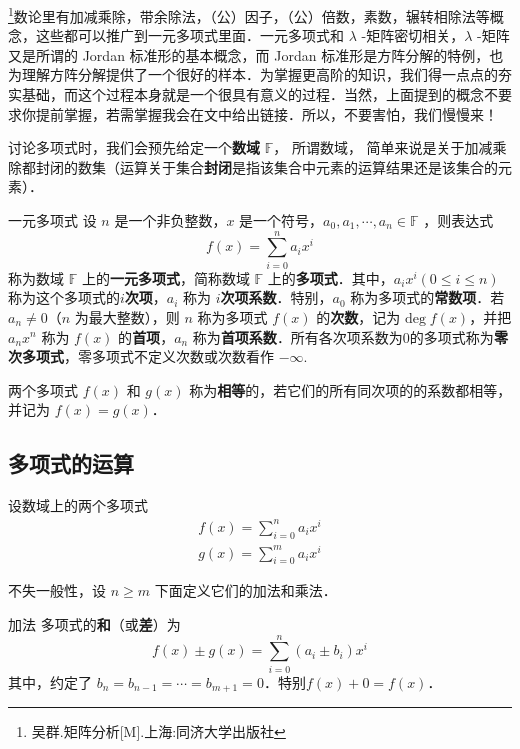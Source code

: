 
\footnote{吴群.矩阵分析[M].上海:同济大学出版社}数论里有加减乘除，带余除法，（公）因子，（公）倍数，素数，辗转相除法等概念，这些都可以推广到一元多项式里面．一元多项式和 $\lambda$ -矩阵密切相关，$\lambda$ -矩阵又是所谓的 Jordan 标准形的基本概念，而 Jordan 标准形是方阵分解的特例，也为理解方阵分解提供了一个很好的样本．为掌握更高阶的知识，我们得一点点的夯实基础，而这个过程本身就是一个很具有意义的过程．当然，上面提到的概念不要求你提前掌握，若需掌握我会在文中给出链接．所以，不要害怕，我们慢慢来！

讨论多项式时，我们会预先给定一个\textbf{数域} $\mathbb{F}$， 所谓数域， 简单来说是关于加减乘除都封闭的数集（运算关于集合\textbf{封闭}是指该集合中元素的运算结果还是该集合的元素）．
\begin{definition}{一元多项式}
设 $n$ 是一个非负整数，$x$ 是一个符号，$a_0,a_1,\cdots,a_n\in \mathbb{F}$ ，则表达式
\begin{equation}
f(x)=\sum_{i=0}^{n}a_i x^i
\end{equation}
称为数域 $\mathbb{F}$ 上的\textbf{一元多项式}，简称数域 $\mathbb{F}$ 上的\textbf{多项式}．其中，$a_ix^i(0\leq i\leq n)$ 称为这个多项式的\textbf{$i$次项}，$a_i$ 称为 \textbf{$i$次项系数}．特别，$a_0$ 称为多项式的\textbf{常数项}．若 $a_n\neq 0$（$n$ 为最大整数），则 $n$ 称为多项式 $f(x)$ 的\textbf{次数}，记为 $\mathrm{deg}\;f(x)$，并把 $a_nx^n$ 称为 $f(x)$ 的\textbf{首项}，$a_n$ 称为\textbf{首项系数}．所有各次项系数为0的多项式称为\textbf{零次多项式}，零多项式不定义次数或次数看作 $-\infty$.
\end{definition}
两个多项式 $f(x)$ 和 $g(x)$ 称为\textbf{相等}的，若它们的所有同次项的的系数都相等，并记为 $f(x)=g(x)$．
\subsection{多项式的运算}
设数域上的两个多项式
\begin{equation}
\begin{aligned}
f(x)=\sum_{i=0}^{n}a_ix^i\\
g(x)=\sum_{i=0}^{m}a_ix^i
\end{aligned}
\end{equation}

不失一般性，设 $n\geq m$
下面定义它们的加法和乘法．
\begin{definition}{加法}
多项式的\textbf{和}（或\textbf{差}）为
\begin{equation}
f(x)\pm g(x)=\sum_{i=0}^n (a_i\pm b_i)x^i
\label{OnePol_eq1}
\end{equation}
其中，约定了 $b_n=b_{n-1}=\cdots=b_{m+1}=0$．特别$f(x)+0=f(x)$．
\end{definition}


